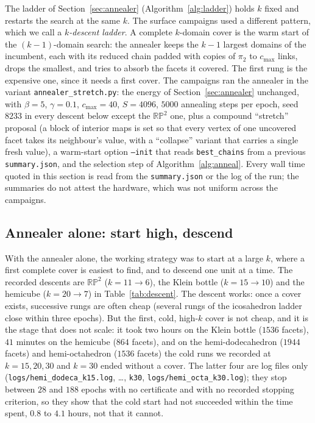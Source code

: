 \documentclass[12pt]{article}
\begin{document}
The ladder of Section~\ref{sec:annealer} (Algorithm~\ref{alg:ladder})
holds $k$ fixed and restarts the search at the same $k$.  The surface
campaigns used a different pattern, which we call a \emph{$k$-descent
ladder}.  A complete $k$-domain cover is the warm start of the
$(k{-}1)$-domain search: the annealer keeps the $k{-}1$ largest domains
of the incumbent, each with its reduced chain padded with copies of
$\pi_2$ to $c_{\max}$ links, drops the smallest, and tries to absorb the
facets it covered.  The first rung is the expensive one, since it
needs a first cover.  The campaigns ran the annealer in the variant
\texttt{annealer\_stretch.py}: the energy of
Section~\ref{sec:annealer} unchanged, with $\beta=5$, $\gamma=0.1$,
$c_{\max}=40$, $S=4096$, $5000$ annealing steps per epoch, seed $8233$
in every descent below except the $\mathbb{RP}^2$ one, plus a compound ``stretch'' proposal (a block
of interior maps is set so that every vertex of one uncovered facet takes
its neighbour's value, with a ``collapse'' variant that carries a single
fresh value), a warm-start option \texttt{--init} that reads
\texttt{best\_chains} from a previous \texttt{summary.json}, and the
selection step of Algorithm~\ref{alg:anneal}.  Every wall time quoted
in this section is read from the \texttt{summary.json} or the log of the
run; the summaries do not attest the hardware, which was not uniform
across the campaigns.

\subsection{Annealer alone: start high, descend}

With the annealer alone, the working strategy was to start at a large
$k$, where a first complete cover is easiest to find, and to descend one
unit at a time.  The recorded descents are
$\mathbb{RP}^2$ ($k=11\to6$), the Klein bottle ($k=15\to10$) and the
hemicube ($k=20\to7$) in Table~\ref{tab:descent}.  The descent works:
once a cover exists, successive rungs are often cheap (several rungs
of the icosahedron ladder close within three epochs).  But the first,
cold, high-$k$ cover is not cheap, and it is the stage that does not scale:
it took two hours on the Klein bottle ($1536$ facets), $41$ minutes on
the hemicube ($864$ facets), and on the hemi-dodecahedron ($1944$ facets)
and hemi-octahedron ($1536$ facets) the cold runs we recorded at
$k=15,20,30$ and $k=30$ ended without a cover.  The latter four
are log files only (\texttt{logs/hemi\_dodeca\_k15.log}, \dots, \texttt{k30},
\texttt{logs/hemi\_octa\_k30.log}); they stop between $28$ and $188$
epochs with no certificate and with no recorded stopping criterion, so
they show that the cold start had not succeeded within the time spent,
$0.8$ to $4.1$ hours, not that it cannot.
\end{document}
